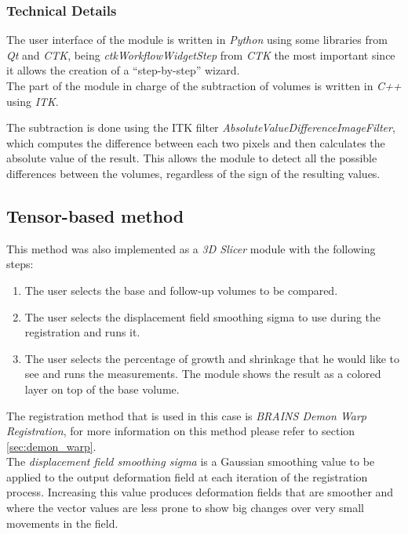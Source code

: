 \subsubsection{Technical Details}
The user interface of the module is written in \textit{Python} using
some libraries from \textit{Qt} and \textit{CTK}, being
\textit{ctkWorkflowWidgetStep} from \textit{CTK} the most important
since it allows the creation of a ``step-by-step'' wizard.\\

The part of the module in charge of the subtraction of volumes is
written in \textit{C++} using \textit{ITK}.

The subtraction is done using the ITK filter
\textit{AbsoluteValueDifferenceImageFilter}, which computes the
difference between each two pixels and then calculates the absolute
value of the result. This allows the module to detect all the possible
differences between the volumes, regardless of the sign of the
resulting values.\\


\subsection{Tensor-based method}
This method was also implemented as a \textit{3D Slicer} module with the following steps:
\begin{enumerate}
\item The user selects the base and follow-up volumes to be compared.
\item The user selects the displacement field smoothing sigma to use during the registration and runs it.
\item The user selects the percentage of growth and shrinkage that he
  would like to see and runs the measurements. The module shows the
  result as a colored layer on top of the base volume.
\end{enumerate}

The registration method that is used in this case is \textit{BRAINS
  Demon Warp Registration}, for more information on this method please
refer to section \ref{sec:demon_warp}.\\

The \textit{displacement field smoothing sigma} is a Gaussian
smoothing value to be applied to the output deformation field at each
iteration of the registration process. Increasing this value produces
deformation fields that are smoother and where the vector values are
less prone to show big changes over very small movements in the field.

